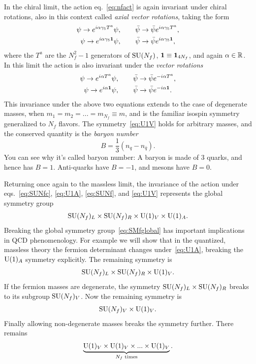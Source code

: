 In the chiral limit, the action eq.~\eqref{eq:nfact} is again invariant under
chiral rotations, also in this context called {\it axial vector rotations},
taking the form
\begin{gather}
  \label{eq:SUNfc}
  \psi\to e^{i\alpha\gamma_5 T^a}\psi,\qquad
    \bar{\psi}\to\bar{\psi}e^{i\alpha\gamma_5 T^a}, \\
  \label{eq:U1A}
  \psi\to e^{i\alpha\gamma_5 {\mathbf 1}}\psi,\qquad
    \bar{\psi}\to\bar{\psi}e^{i\alpha\gamma_5 {\mathbf 1}},
\end{gather}
where the $T^a$ are the $N_f^2-1$ generators of $\operatorname{SU}(N_f)$,
${\mathbf 1}\equiv{\mathbf 1}_{4N_f}$, and again $\alpha\in\mathbb{R}$.
In this limit the action is also invariant under the
{\it vector rotations}
\begin{gather}
  \label{eq:SUNf}
  \psi\to e^{i\alpha T^a}\psi,\qquad
    \bar{\psi}\to\bar{\psi}e^{-i\alpha T^a}, \\
  \label{eq:U1V}
  \psi\to e^{i\alpha {\mathbf 1}}\psi,\qquad
    \bar{\psi}\to\bar{\psi}e^{-i\alpha {\mathbf 1}}.
\end{gather}
This invariance under the above two equations extends to the case of degenerate
masses, when $m_1=m_2=...=m_{N_f}\equiv m$, and is the familiar isospin
symmetry generalized to $N_f$ flavors. The symmetry~\eqref{eq:U1V} holds for
arbitrary masses, and the conserved quantity is the {\it baryon number}
\begin{equation}
    B=\frac{1}{3}(n_q-n_{\bar{q}}).
\end{equation}
You can see why it's called baryon number: A baryon is made of 3
quarks, and hence has $B=1$. Anti-quarks have $B=-1$, and
mesons have $B=0$.

Returning once again to the massless limit, the invariance of the action under
eqs.~\eqref{eq:SUNfc}, \eqref{eq:U1A}, \eqref{eq:SUNf}, and \eqref{eq:U1V}
represents the global symmetry group
\begin{equation}\label{eq:SMfglobal}
  \operatorname{SU}(N_f)_L\times\operatorname{SU}(N_f)_R\times\operatorname{U}(1)_V\times\operatorname{U}(1)_A.
\end{equation}
Breaking the global symmetry group~\eqref{eq:SMfglobal} has important
implications in QCD phenomenology. For example we will show that in the
quantized, massless theory the fermion determinant changes
under~\eqref{eq:U1A}, breaking the $\operatorname{U}(1)_A$ symmetry explicitly. The remaining
symmetry is
\begin{equation}\label{eq:SMglobalbUA}
  \operatorname{SU}(N_f)_L\times\operatorname{SU}(N_f)_R\times\operatorname{U}(1)_V.
\end{equation}
If the fermion masses are degenerate, the symmetry $\operatorname{SU}(N_f)_L\times\operatorname{SU}(N_f)_R$
breaks to its subgroup $\operatorname{SU}(N_f)_V$. Now the remaining symmetry is
\begin{equation}
  \operatorname{SU}(N_f)_V\times\operatorname{U}(1)_V.
\end{equation}
Finally allowing non-degenerate masses breaks the symmetry further. 
There remains
\begin{equation}
  \underbrace{\operatorname{U}(1)_V\times\operatorname{U}(1)_V\times...\times\operatorname{U}(1)_V}_\text{$N_f$ times}.
\end{equation}

